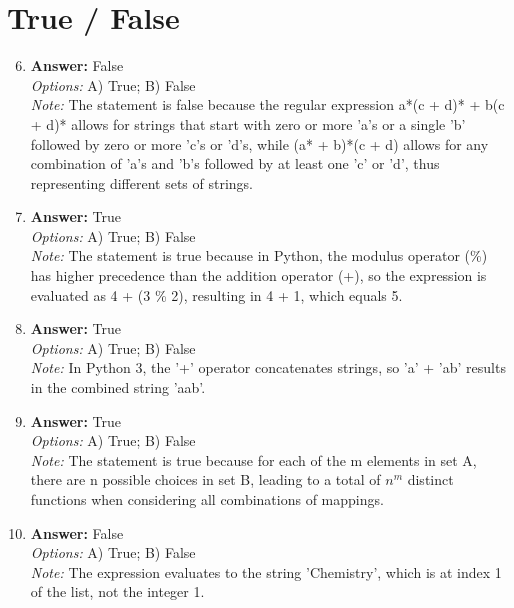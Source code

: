\documentclass[12pt]{article}
\begin{document}
\section*{True / False}
\begin{enumerate}[label=\arabic*.]
\setcounter{enumi}{5}
\item \textbf{Answer:} False
\\ \textit{Options:} A) True; B) False
\\ \textit{Note:} The statement is false because the regular expression a*(c + d)* + b(c + d)* allows for strings that start with zero or more 'a's or a single 'b' followed by zero or more 'c's or 'd's, while (a* + b)*(c + d) allows for any combination of 'a's and 'b's followed by at least one 'c' or 'd', thus representing different sets of strings.
\item \textbf{Answer:} True
\\ \textit{Options:} A) True; B) False
\\ \textit{Note:} The statement is true because in Python, the modulus operator (\%) has higher precedence than the addition operator (+), so the expression is evaluated as 4 + (3 \% 2), resulting in 4 + 1, which equals 5.
\item \textbf{Answer:} True
\\ \textit{Options:} A) True; B) False
\\ \textit{Note:} In Python 3, the '+' operator concatenates strings, so 'a' + 'ab' results in the combined string 'aab'.
\item \textbf{Answer:} True
\\ \textit{Options:} A) True; B) False
\\ \textit{Note:} The statement is true because for each of the m elements in set A, there are n possible choices in set B, leading to a total of $n^m$ distinct functions when considering all combinations of mappings.
\item \textbf{Answer:} False
\\ \textit{Options:} A) True; B) False
\\ \textit{Note:} The expression evaluates to the string 'Chemistry', which is at index 1 of the list, not the integer 1.
\end{enumerate}
\end{document}
